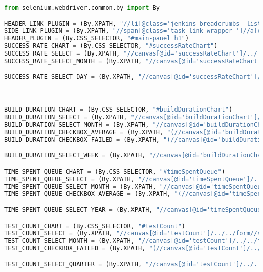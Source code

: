 \begin{lstlisting}[language=Python]
from selenium.webdriver.common.by import By

HEADER_LINK_PLUGIN = (By.XPATH, "//li[@class='jenkins-breadcrumbs__list-item']//a[contains(@href,'buildConfiguration')]")
SIDE_LINK_PLUGIN = (By.XPATH, "//span[@class='task-link-wrapper ']//a[contains(@href,'buildConfiguration')]")
HEADER_PLUGIN = (By.CSS_SELECTOR, "#main-panel h1")
SUCCESS_RATE_CHART = (By.CSS_SELECTOR, "#successRateChart")
SUCCESS_RATE_SELECT = (By.XPATH, "//canvas[@id='successRateChart']/../../form//select")
SUCCESS_RATE_SELECT_MONTH = (By.XPATH, "//canvas[@id='successRateChart']/../../form//select//option")

SUCCESS_RATE_SELECT_DAY = (By.XPATH, "//canvas[@id='successRateChart']/../../form//select//option[text()='Day']")



BUILD_DURATION_CHART = (By.CSS_SELECTOR, "#buildDurationChart")
BUILD_DURATION_SELECT = (By.XPATH, "//canvas[@id='buildDurationChart']/../../form//select")
BUILD_DURATION_SELECT_MONTH = (By.XPATH, "//canvas[@id='buildDurationChart']/../../form//select//option")
BUILD_DURATION_CHECKBOX_AVERAGE = (By.XPATH, "(//canvas[@id='buildDurationChart']/../../form//input)[1]")
BUILD_DURATION_CHECKBOX_FAILED = (By.XPATH, "(//canvas[@id='buildDurationChart']/../../form//input)[2]")

BUILD_DURATION_SELECT_WEEK = (By.XPATH, "//canvas[@id='buildDurationChart']/../../form//select//option[text()='Week']")

TIME_SPENT_QUEUE_CHART = (By.CSS_SELECTOR, "#timeSpentQueue")
TIME_SPENT_QUEUE_SELECT = (By.XPATH, "//canvas[@id='timeSpentQueue']/../../form//select")
TIME_SPENT_QUEUE_SELECT_MONTH = (By.XPATH, "//canvas[@id='timeSpentQueue']/../../form//select//option")
TIME_SPENT_QUEUE_CHECKBOX_AVERAGE = (By.XPATH, "(//canvas[@id='timeSpentQueue']/../../form//input)[1]")

TIME_SPENT_QUEUE_SELECT_YEAR = (By.XPATH, "//canvas[@id='timeSpentQueue']/../../form//select//option[text()='Year']")

TEST_COUNT_CHART = (By.CSS_SELECTOR, "#testCount")
TEST_COUNT_SELECT = (By.XPATH, "//canvas[@id='testCount']/../../form//select")
TEST_COUNT_SELECT_MONTH = (By.XPATH, "//canvas[@id='testCount']/../../form//select//option")
TEST_COUNT_CHECKBOX_FAILED = (By.XPATH, "(//canvas[@id='testCount']/../../form//input)[1]")

TEST_COUNT_SELECT_QUARTER = (By.XPATH, "//canvas[@id='testCount']/../../form//select//option[text()='Quarter']")


\end{lstlisting}
